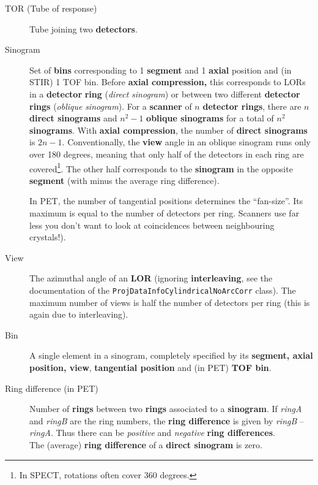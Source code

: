 \documentclass{article}
\begin{document}
\begin{description}
\item[TOR (Tube of response)] 
Tube joining two \textbf{detectors}. 

\item[Sinogram] 
Set of \textbf{bins} corresponding to 1 \textbf{segment} and 1 \textbf{axial} position and (in STIR)
1 TOF bin.
Before \textbf{axial compression,} this corresponds to LORs in a \textbf{detector} \textbf{ring} 
(\textit{direct} \textit{sinogram}) or between two different \textbf{detector} \textbf{rings} 
(\textit{oblique} \textit{sinogram}). For a \textbf{scanner} of $n$ \textbf{detector 
rings}, there are $n$ \textbf{direct sinograms} and $n^2-1$ \textbf{oblique 
sinograms} for a total of $n^2$ \textbf{sinograms}. With \textbf{axial 
compression}, the number of \textbf{direct sinograms} is $2n-1$. Conventionally, 
the \textbf{view} angle in an oblique sinogram runs only over 180 
degrees, meaning that only half of the detectors in each ring 
are covered\footnote{In SPECT, rotations often cover 360 degrees.}.
The other half corresponds to the \textbf{sinogram} in 
the opposite \textbf{segment} (with minus the average ring difference).

In PET, the number of tangential positions determines the ``fan-size''. Its maximum is
equal to the number of detectors per ring. Scanners use far less
you don’t want to look at coincidences between neighbouring crystals!).

\item[View] 
The azimuthal angle of an \textbf{LOR} (ignoring \textbf{interleaving}, 
see the documentation of the \texttt{ProjDataInfoCylindricalNoArcCorr}
class).
The maximum number of views is half the number of detectors per ring
(this is again due to interleaving).

\item[Bin] 
A single element in a sinogram, completely specified by its \textbf{segment, 
axial} \textbf{position, view}, \textbf{tangential position} and (in PET) \textbf{TOF bin}.

\item[Ring difference (in PET)] 
Number of \textbf{rings} between two \textbf{rings} associated to a \textbf{sinogram}. 
If \textit{ringA} and \textit{ringB} are the ring numbers, the \textbf{ring 
difference} is given by \textit{ringB} -- \textit{ringA}. Thus there can be \textit{positive} 
and \textit{negative} \textbf{ring differences}.\\
The (average) \textbf{ring difference} of a \textbf{direct sinogram} is 
zero.


\end{description}
\end{document}
